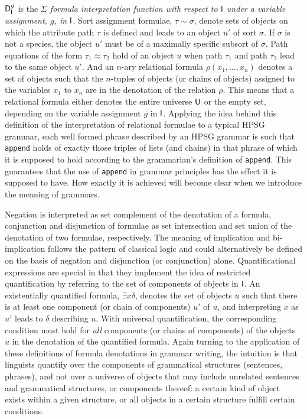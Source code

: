 \documentclass[output=paper
                ,modfonts
                ,nonflat
	        ,collection
	        ,collectionchapter
	        ,collectiontoclongg
 	        ,biblatex
                ,babelshorthands
                ,newtxmath
                ,draftmode
                ,colorlinks, citecolor=brown
]{./langsci/langscibook}
\begin{document}
{$\mathsf{D}_{\mathsf{I}}^g$ is the \emph{$\Sigma$ formula interpretation function with
  respect to $\mathsf{I}$ under a variable assignment, $g$, in $\mathsf{I}$}.
Sort assignment formulae, $\tau\sim\sigma$, denote sets of objects on
which the attribute path $\tau$ is defined and leads to an object $u'$
of sort $\sigma$. If $\sigma$ is not a species, the object $u'$ must
be of a maximally specific subsort of $\sigma$. Path equations of the
form $\tau_1 \approx \tau_2$ hold of an object $u$ when path
$\tau_1$ and path $\tau_2$ lead to the same object $u'$. And an
$n$-ary relational formula $\rho(x_1,\ldots,x_n)$ denotes a set of
objects such that the $n$-tuples of objects (or chains of objects)
assigned to the variables $x_1$ to $x_n$ are in the denotation of the
relation $\rho$. This means that a relational formula either denotes
the entire universe $\mathsf{U}$ or the empty set, depending on the
variable assignment $g$ in $\mathsf{I}$. Applying
the idea behind this definition of the interpretation of relational
formulae to a typical HPSG grammar, each well formed phrase described
by an HPSG grammar is such that \texttt{append} holds of exactly those
triples of lists (and chains) in that phrase of which it is supposed
to hold according to the grammarian's definition of
\texttt{append}. This guarantees that the use of \texttt{append}
in grammar principles has the effect it is supposed to have. How exactly
it is achieved will become clear when we introduce the meaning of grammars.

Negation is interpreted as set complement of the denotation of a
formula, conjunction and disjunction of formulae as set intersection
and set union of the denotation of two formulae, respectively. The
meaning of implication and bi-implication follows the pattern of
classical logic and could alternatively be defined on the basis of
negation and disjunction (or conjunction) alone. Quantificational
expressions are special in that they implement the idea of restricted
quantification by referring to the set of components of objects in
$\mathsf{I}$.  An existentially quantified formula, $\exists x\delta$,
denotes the set of objects $u$ such that there is at least one
component (or chain of components) $u'$ of $u$, and interpreting $x$
as $u'$ leads to $\delta$ describing $u$.  With universal
quantification, the corresponding condition must hold for \emph{all}
components (or chains of components) of the objects $u$ in the denotation
of the quantified formula. Again turning to the
application of these definitions of formula denotations in grammar
writing, the intuition is that linguists quantify over the components
of grammatical structures (sentences, phrases), and not over a
universe of objects that may include unrelated sentences and
grammatical structures, or components thereof: a certain kind of
object exists within a given structure, or all objects in a certain
structure fulfill certain conditions.


}
\end{document}
